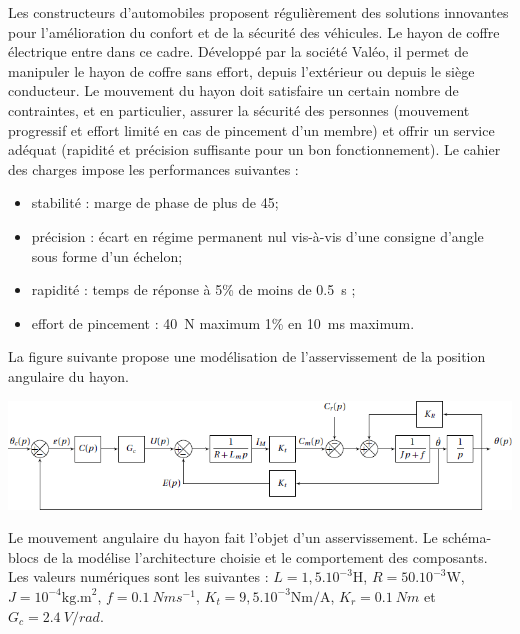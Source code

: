 \documentclass[10pt,fleqn]{article} %
\begin{document}

\vspace{5cm}
\pagestyle{fancy}
\thispagestyle{plain}

\def\columnseprulecolor{\color{ocre}}
\setlength{\columnseprule}{0.4pt} 

\def\pathfig{images}

\begin{multicols}{2}
Les constructeurs d’automobiles proposent régulièrement des solutions
innovantes pour l’amélioration du confort et de la sécurité des
véhicules. Le hayon de coffre électrique entre dans ce cadre. Développé
par la société Valéo, il permet de manipuler le hayon de coffre sans
effort, depuis l’extérieur ou depuis le siège conducteur.
Le mouvement du hayon doit satisfaire un certain nombre de contraintes,
et en particulier, assurer la sécurité des personnes (mouvement
progressif et effort limité en cas de pincement d’un membre)
et offrir un service adéquat (rapidité et précision suffisante pour un
bon fonctionnement). Le cahier des charges impose les performances
suivantes :
\begin{itemize}
\item stabilité : marge de phase de plus de 45\degres;
\item précision : écart en régime permanent nul vis-à-vis d’une consigne d’angle sous forme d’un
échelon;
\item rapidité : temps de réponse à 5\% de moins de \SI{0,5}{s} ;
\item effort de pincement : \SI{40}{N} maximum 1\% en \SI{10}{ms} maximum.
\end{itemize}
La figure suivante propose une modélisation de l’asservissement de la position angulaire du hayon.

\begin{center}
\includegraphics[width=\linewidth]{images/fig_02}
\end{center}


Le mouvement angulaire du hayon fait l’objet d’un asservissement. Le schéma-blocs de la
modélise l’architecture choisie et le comportement des composants. Les valeurs numériques
sont les suivantes : 
$L = 1,5.10^{-3} \text{H}$, 
$R = 50.10^{-3}\text{W}$, 
$J = 10^{-4}\text{kg.m}^2$, 
$f = \SI{0,1}{Nms^{-1}}$,
$K_t = 9,5.10^{-3}\text{Nm/A}$, 
$K_r = \SI{0,1}{Nm}$ et $G_c = \SI{2,4}{V/rad}$.



\end{multicols}
\end{document}
